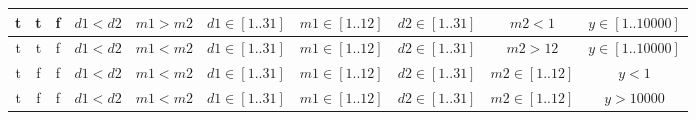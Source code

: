 \documentclass[12pt,a4paper]{article}
\begin{document}
\begin{tabular}{|c|c|c|c|c|c|c|c|c|c|}
\hline
t & t & f & $d1 < d2$ & $m1 > m2$ & $d1 \in [1..31]$ & $m1 \in [1..12]$ & $d2 \in [1..31]$ & $m2 < 1$ & $y \in [1..10000]$ \\
\hline
t & t & f & $d1 < d2$ & $m1 < m2$ & $d1 \in [1..31]$ & $m1 \in [1..12]$ & $d2 \in [1..31]$ & $m2 > 12$ & $y \in [1..10000]$ \\
\hline
t & f & f & $d1 < d2$ & $m1 < m2$ & $d1 \in [1..31]$ & $m1 \in [1..12]$ & $d2 \in [1..31]$ & $m2 \in [1..12]$ & $y < 1$ \\
\hline
t & f & f & $d1 < d2$ & $m1 < m2$ & $d1 \in [1..31]$ & $m1 \in [1..12]$ & $d2 \in [1..31]$ & $m2 \in [1..12]$ & $y > 10000$ \\
\hline
\end{tabular}
\end{document}
